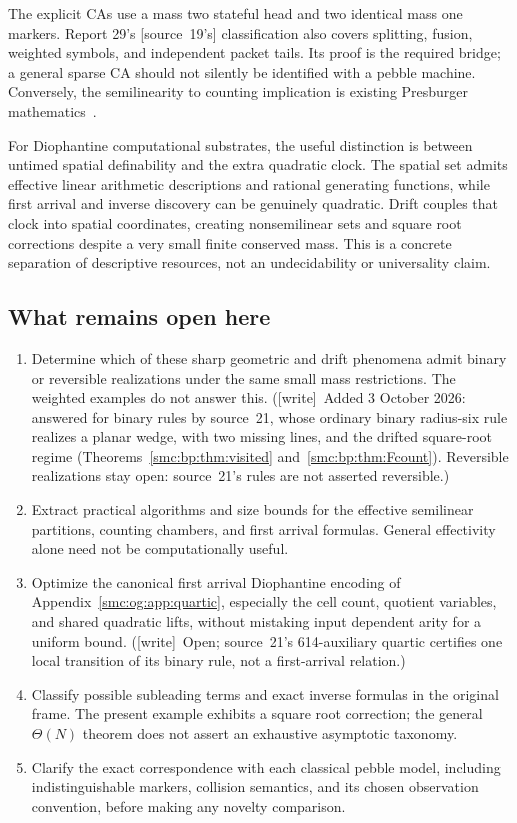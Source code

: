 \documentclass[11pt,letterpaper]{article}
\numberwithin{equation}{section}
\theoremstyle{definition}
\theoremstyle{remark}
\newcommand{\wtag}{\textup{[write]}}
\begin{document}
The explicit CAs use a mass two stateful head and two identical mass one markers. Report 29's \textup{[source~19's]} classification also covers splitting, fusion, weighted symbols, and independent packet tails. Its proof is the required bridge; a general sparse CA should not silently be identified with a pebble machine. Conversely, the semilinearity to counting implication is existing Presburger mathematics~\cite{woods2015}.

For Diophantine computational substrates, the useful distinction is between untimed spatial definability and the extra quadratic clock. The spatial set admits effective linear arithmetic descriptions and rational generating functions, while first arrival and inverse discovery can be genuinely quadratic. Drift couples that clock into spatial coordinates, creating nonsemilinear sets and square root corrections despite a very small finite conserved mass. This is a concrete separation of descriptive resources, not an undecidability or universality claim.

\subsection{What remains open here}
\begin{enumerate}
\item\label{smc:og:q:binary} Determine which of these sharp geometric and drift phenomena admit binary or reversible realizations under the same small mass restrictions. The weighted examples do not answer this. (\wtag\ Added 3 October 2026: answered for binary rules by source~21, whose ordinary binary radius-six rule realizes a planar wedge, with two missing lines, and the drifted square-root regime (Theorems~\ref{smc:bp:thm:visited} and~\ref{smc:bp:thm:Fcount}). Reversible realizations stay open: source~21's rules are not asserted reversible.)
\item\label{smc:og:q:algorithms} Extract practical algorithms and size bounds for the effective semilinear partitions, counting chambers, and first arrival formulas. General effectivity alone need not be computationally useful.
\item\label{smc:og:q:quartic} Optimize the canonical first arrival Diophantine encoding of Appendix~\ref{smc:og:app:quartic}, especially the cell count, quotient variables, and shared quadratic lifts, without mistaking input dependent arity for a uniform bound. (\wtag\ Open; source~21's 614-auxiliary quartic certifies one local transition of its binary rule, not a first-arrival relation.)
\item\label{smc:og:q:subleading} Classify possible subleading terms and exact inverse formulas in the original frame. The present example exhibits a square root correction; the general $\Theta(N)$ theorem does not assert an exhaustive asymptotic taxonomy.
\item\label{smc:og:q:pebble} Clarify the exact correspondence with each classical pebble model, including indistinguishable markers, collision semantics, and its chosen observation convention, before making any novelty comparison.
\end{enumerate}
\end{document}
